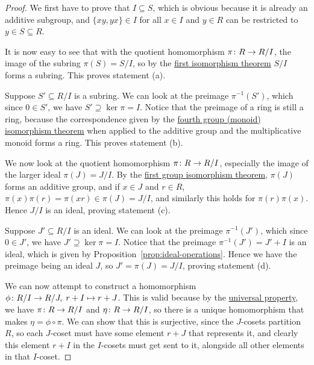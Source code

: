 \begin{proof}
    We first have to prove that \(I \subseteq S\),
    which is obvious because it is already an additive subgroup,
    and \(\{xy,yx\} \in I\) for all \(x \in I\) and \(y \in R\)
    can be restricted to \(y \in S \subseteq R\).

    It is now easy to see that
    with the quotient homomorphism \(\pi\colon R\to R/I\),
    the image of the subring \(\pi(S) = S/I\),
    so by the \hyperref[thm:iso-1-group]{first isomorphism theorem}
    \(S/I\) forms a subring.
    This proves statement (a).

    \medskip

    Suppose \(S' \subseteq R/I\) is a subring.
    We can look at the preimage \(\pi^{-1}(S')\),
    which since \(0 \in S'\), we have \(S' \supseteq \ker\pi = I\).
    Notice that the preimage of a ring is still a ring,
    because the correspondence given by
    the \hyperref[thm:iso-4-group]{fourth group (monoid) isomorphism theorem}
    when applied to the additive group and the multiplicative monoid
    forms a ring.
    This proves statement (b).

    \medskip

    We now look at the quotient homomorphism \(\pi\colon R\to R/I\),
    especially the image of the larger ideal \(\pi(J) = J/I\).
    By the \hyperref[thm:iso-1-group]{first group isomorphism theorem},
    \(\pi(J)\) forms an additive group,
    and if \(x \in J\) and \(r \in R\),
    \(\pi(x)\pi(r) = \pi(xr) \in \pi(J) = J/I\),
    and similarly this holds for \(\pi(r)\pi(x)\).
    Hence \(J/I\) is an ideal, proving statement (c).

    \medskip

    Suppose \(J' \subseteq R/I\) is an ideal.
    We can look at the preimage \(\pi^{-1}(J')\),
    which since \(0 \in J'\), we have \(J' \supseteq \ker\pi = I\).
    Notice that the preimage \(\pi^{-1}(J') = J' + I\) is an ideal,
    which is given by Proposition~\ref{prop:ideal-operations}.
    Hence we have the preimage being an ideal \(J\),
    so \(J' = \pi(J) = J/I\),
    proving statement (d).

    \medskip

    We can now attempt to construct a homomorphism
    \(\phi\colon R/I\to R/J,\;r+I\mapsto r+J\).
    This is valid because
    by the \hyperref[thm:univ-prop-quotient-ring]{universal property},
    we have \(\pi\colon R\to R/I\) and \(\eta\colon R\to R/I\),
    so there is a unique homomorphism that makes \(\eta = \phi\circ\pi\).
    We can show that this is surjective,
    since the \(J\)-cosets partition \(R\),
    so each \(J\)-coset must have some element \(r+J\) that represents it,
    and clearly this element \(r+I\) in the \(I\)-cosets must get sent to it,
    alongside all other elements in that \(I\)-coset.


\end{proof}

